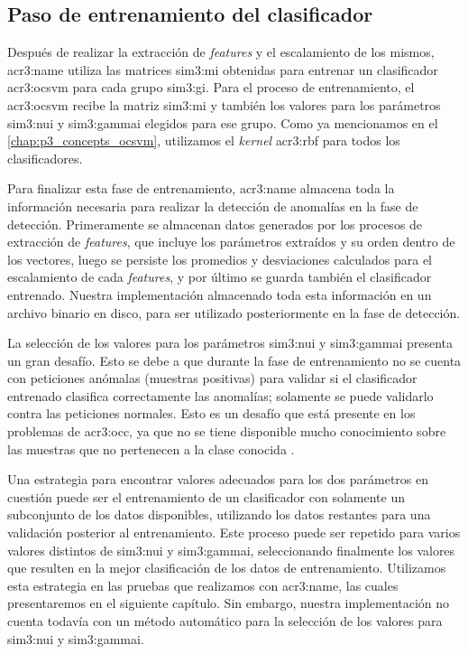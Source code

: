 \subsection{Paso de entrenamiento del clasificador}

Después de realizar la extracción de \textit{features} y el escalamiento
de los mismos, \gls{acr3:name} utiliza las matrices \gls{sim3:mi} obtenidas
para entrenar un clasificador \gls{acr3:ocsvm} para cada grupo \gls{sim3:gi}.
Para el proceso de entrenamiento, el \gls{acr3:ocsvm} recibe la matriz
\gls{sim3:mi} y también los valores para los parámetros \gls{sim3:nui}
y \gls{sim3:gammai} elegidos para ese grupo.
Como ya mencionamos en el \autoref{chap:p3_concepts_ocsvm}, utilizamos
el \textit{kernel} \gls{acr3:rbf} para todos los clasificadores.

Para finalizar esta fase de entrenamiento, \gls{acr3:name} almacena toda
la información necesaria para realizar la detección de anomalías en la
fase de detección. Primeramente se almacenan datos generados por los procesos
de extracción de \textit{features}, que incluye los parámetros extraídos
y su orden dentro de los vectores, luego se persiste los promedios y
desviaciones calculados para el escalamiento de cada \textit{features},
y por último se guarda también el clasificador entrenado.
Nuestra implementación almacenado toda esta información en un archivo
binario en disco, para ser utilizado posteriormente en la fase de detección.

La selección de los valores para los parámetros \gls{sim3:nui} y
\gls{sim3:gammai} presenta un gran desafío. Esto se debe a que durante
la fase de entrenamiento no se cuenta con peticiones anómalas (muestras
positivas) para validar si el clasificador entrenado clasifica correctamente
las anomalías; solamente se puede validarlo contra las peticiones normales.
Esto es un desafío que está presente en los problemas de \gls{acr3:occ},
ya que no se tiene disponible mucho conocimiento sobre las muestras que
no pertenecen a la clase conocida
\citep{khan2009survey}. %

Una estrategia para encontrar valores adecuados para los dos parámetros
en cuestión puede ser el entrenamiento de un clasificador con solamente
un subconjunto de los datos disponibles, utilizando los datos restantes
para una validación posterior al entrenamiento. Este proceso puede ser
repetido para varios valores distintos de \gls{sim3:nui} y \gls{sim3:gammai},
seleccionando finalmente los valores que resulten en la mejor clasificación
de los datos de entrenamiento.
Utilizamos esta estrategia en las pruebas que realizamos con \gls{acr3:name},
las cuales presentaremos en el siguiente capítulo. Sin embargo, nuestra
implementación no cuenta todavía con un método automático para la selección
de los valores para \gls{sim3:nui} y \gls{sim3:gammai}.


